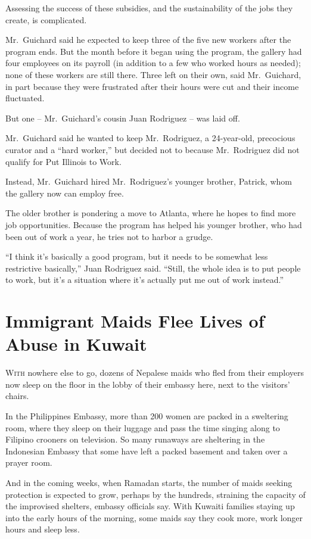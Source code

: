 ﻿\documentclass[12pt]{article}
\begin{document}
Assessing the success of these subsidies, and the sustainability of the jobs they create, is
complicated.

Mr.~Guichard said he expected to keep three of the five new workers after the program ends. But the
month before it began using the program, the gallery had four employees on its payroll (in addition
to a few who worked hours as needed); none of these workers are still there. Three left on their
own, said Mr.~Guichard, in part because they were frustrated after their hours were cut and their
income fluctuated.

But one -- Mr.~Guichard's cousin Juan Rodriguez -- was laid off.

Mr.~Guichard said he wanted to keep Mr.~Rodriguez, a 24-year-old, precocious curator and a ``hard
worker,'' but decided not to because Mr.~Rodriguez did not qualify for Put Illinois to Work.

Instead, Mr.~Guichard hired Mr.~Rodriguez's younger brother, Patrick, whom the gallery now can
employ free.

The older brother is pondering a move to Atlanta, where he hopes to find more job opportunities.
Because the program has helped his younger brother, who had been out of work a year, he tries not to
harbor a grudge.

``I think it's basically a good program, but it needs to be somewhat less restrictive basically,''
Juan Rodriguez said. ``Still, the whole idea is to put people to work, but it's a situation where
it's actually put me out of work instead.''

\section{Immigrant Maids Flee Lives of Abuse in Kuwait}

\lettrine{W}{ith} nowhere else to go, dozens of Nepalese maids who fled from
their employers now sleep on the floor in the lobby of their embassy here, next to the visitors'
chairs.

In the Philippines Embassy, more than 200 women are packed in a sweltering room, where they sleep on
their luggage and pass the time singing along to Filipino crooners on television. So many runaways
are sheltering in the Indonesian Embassy that some have left a packed basement and taken over a
prayer room.

And in the coming weeks, when Ramadan starts, the number of maids seeking protection is expected to
grow, perhaps by the hundreds, straining the capacity of the improvised shelters, embassy officials
say. With Kuwaiti families staying up into the early hours of the morning, some maids say they cook
more, work longer hours and sleep less.
\end{document}
